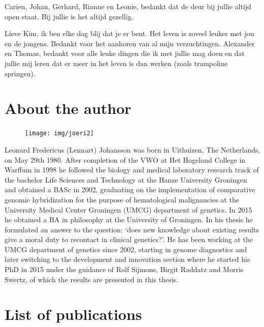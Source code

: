 \begin{appendices}
Carien, Johan, Gerhard, Rianne en Leonie, bedankt dat de deur bij jullie altijd open staat. Bij jullie is het altijd gezellig. 

Lieve Kim, ik ben elke dag blij dat je er bent. Het leven is zoveel leuker met jou en de jongens. Bedankt voor het aanhoren van al mijn verzuchtingen. Alexander en Thomas, bedankt voor alle leuke dingen die ik met jullie mag doen en dat jullie mij leren dat er meer in het leven is dan werken (zoals trampoline springen). 

\chapter{About the author}

\begin{figure}
  \begin{center}
    \texttt{[image: img/joeri2]}
  \end{center}
\end{figure}
Leonard Fredericus (Lennart) Johansson was born in Uithuizen, The Netherlands, on May 29th 1980. 
After completion of the VWO at Het Hogeland College in Warffum in 1998 he followed the biology and medical laboratory research track of the bachelor Life Sciences and Technology at the Hanze University Groningen and obtained a BASc in 2002, graduating on the implementation of comparative genomic hybridization for the purpose of hematological malignancies at the University Medical Center Groningen (UMCG) department of genetics. 
In 2015 he obtained a BA in philosophy at the University of Groningen. 
In his thesis he formulated an answer to the question: ‘does new knowledge about existing results give a moral duty to recontact in clinical genetics?’. 
He has been working at the UMCG department of genetics since 2002, starting in genome diagnostics and later switching to the development and innovation section where he started his PhD in 2015 under the guidance of Rolf Sijmons, Birgit Raddatz and Morris Swertz, of which the results are presented in this thesis.

\chapter{List of publications}


\end{appendices}
